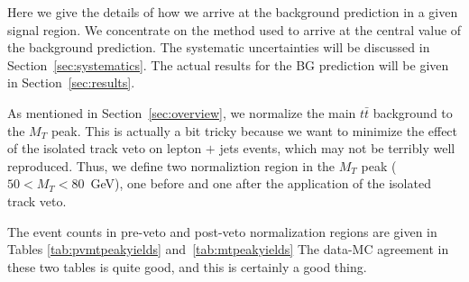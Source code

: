 

Here we give the details of how we arrive at the background prediction
in a given signal region.  We concentrate on the method used
to arrive at the central value of the background prediction.  The
systematic
uncertainties will be discussed in Section~\ref{sec:systematics}.
The actual results for the BG prediction will be given in Section~\ref{sec:results}.

As mentioned in Section~\ref{sec:overview}, we normalize the main
$t\bar{t}$
background to the $M_T$ peak.  This is actually a bit tricky because 
we want to minimize the effect of the isolated track veto on 
lepton $+$ jets events, which may not be terribly well reproduced.
Thus, we define two normaliztion region in the $M_T$ peak ($50 < M_T < 80$~GeV),
one before and one after the application of the isolated track veto.

The event counts in pre-veto and post-veto normalization regions
are given in Tables \ref{tab:pvmtpeakyields} and~\ref{tab:mtpeakyields}
The data-MC agreement in these two tables is quite good, and this is 
certainly a good thing.




